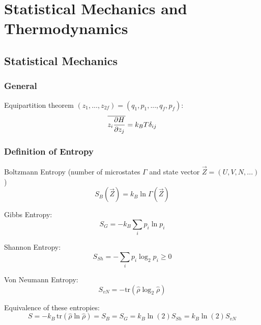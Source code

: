 \section{Statistical Mechanics and Thermodynamics}
	\subsection{Statistical Mechanics}
		\subsubsection{General}
			\noindent
			Equipartition theorem $(z_1,...,z_{2f}) = (q_1, p_1, ..., q_f, p_f)$:
			\begin{equation}
				\overline{ z_i \frac{\partial H}{\partial z_j}} = k_B T \delta_{ij}
			\end{equation}

		\subsubsection{Definition of Entropy}
			\noindent
			Boltzmann Entropy (number of microstates $\Gamma$ and state vector $\vec{Z}=(U,V,N,...)$)
			\begin{equation}
				S_{B}(\vec{Z}) = k_B \ln\Gamma(\vec{Z})
			\end{equation}

			\noindent
			Gibbs Entropy:
			\begin{equation}
				S_{G} = -k_B \sum_i p_i \ln p_i
			\end{equation}

			\noindent
			Shannon Entropy:
			\begin{equation}
				S_{Sh} = -\sum_i p_i\log_2{p_i} \ge 0
			\end{equation}

			\noindent
			Von Neumann Entropy:
			\begin{equation}
				S_{vN} = -\mathrm{tr}(\hat{\rho}\log_2\hat{\rho})
			\end{equation}

			\noindent
			Equivalence of these entropies:
			\begin{equation}
				S = -k_B\,\mathrm{tr}(\hat{\rho} \ln \hat{\rho}) = S_B = S_G = k_B\ln(2) S_{Sh} = k_B\ln(2) S_{vN}
			\end{equation}

